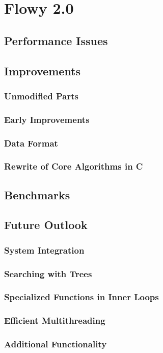 \chapter{Flowy 2.0}\label{ch:flowy-2}

\section{Performance Issues}\label{sec:performance-issues}
\section{Improvements}\label{sec:improvements}
	\subsection{Unmodified Parts}\label{subsec:unmodified-parts}
	\subsection{Early Improvements}\label{subsec:early-improvements}
	\subsection{Data Format}\label{subsec:data-format}
	\subsection{Rewrite of Core Algorithms in C}\label{subsec:core-alg-c}
\section{Benchmarks}\label{sec:benchmarks}
\section{Future Outlook}\label{sec:flowy2-future}
	\subsection{System Integration}\label{subsec:system-integration}
	\subsection{Searching with Trees}\label{subsec:search-trees}
	\subsection{Specialized Functions in Inner Loops}\label{subsec:special-fns}
	\subsection{Efficient Multithreading}\label{subsec:multithreading}
	\subsection{Additional Functionality}\label{subsec:additional-functionality}